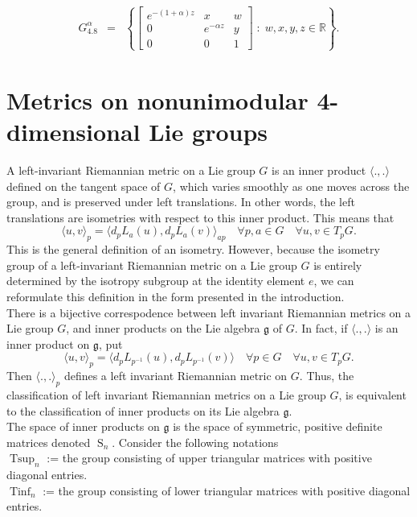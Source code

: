 \documentclass[12pt,a4paper,twoside]{article}
\theoremstyle{definition}
\begin{document}
\begin{eqnarray*}
G_{4.8}^{\alpha} &=& \left\lbrace \begin{bmatrix}
e^{-(1 + \alpha)z} & x & w\\
0 & e^{-\alpha z} & y\\
0 & 0 & 1
\end{bmatrix} \;:\; w, x, y, z \in \mathbb{R}\right\rbrace.
\end{eqnarray*}
\section{Metrics on nonunimodular 4-dimensional Lie groups}
A left-invariant Riemannian metric on a Lie group $G$ is an inner product $\langle ., .\rangle$ defined on the tangent space of $G$, which varies smoothly as one moves across the group, and is preserved under left translations. In other words, the left translations are isometries with respect to this inner product. This means that 
$$\langle u, v\rangle_{p} = \langle d_{p} L_{a}(u), d_{p} L_{a}(v)\rangle_{ap} \quad \forall p, a \in G \quad \forall u, v \in T_{p}G.$$
This is the general definition of an isometry. However, because the isometry group of a left-invariant Riemannian metric on a Lie group $G$ is entirely determined by the isotropy subgroup at the identity element $e$, we can reformulate this definition in the form presented in the introduction.\\
There is a bijective correspodence between left invariant Riemannian metrics on a Lie group $G$, and inner products on the Lie algebra $\mathfrak{g}$ of $G$. In fact, if $\langle ., .\rangle$ is an inner product on $\mathfrak{g}$, put 
$$\langle u, v\rangle_{p} = \langle d_{p} L_{p^{-1}}(u), d_{p} L_{p^{-1}}(v)\rangle \quad \forall p \in G \quad \forall u, v \in T_{p}G.$$
Then $\langle ., .\rangle_{p}$ defines a left invariant Riemannian metric on $G$. Thus, the classification of left invariant Riemannian metrics on a Lie group $G$, is equivalent to the classification of inner products on its Lie algebra $\mathfrak{g}$.\\
The space of inner products on $\mathfrak{g}$ is the space of symmetric, positive definite matrices denoted $\operatorname{S}_n$. Consider the following notations\\
$\operatorname{Tsup}_n$ := the group consisting of upper triangular matrices with positive diagonal entries.\\
$\operatorname{Tinf}_n$ := the group consisting of lower triangular matrices with positive diagonal entries.\\
\end{document}

